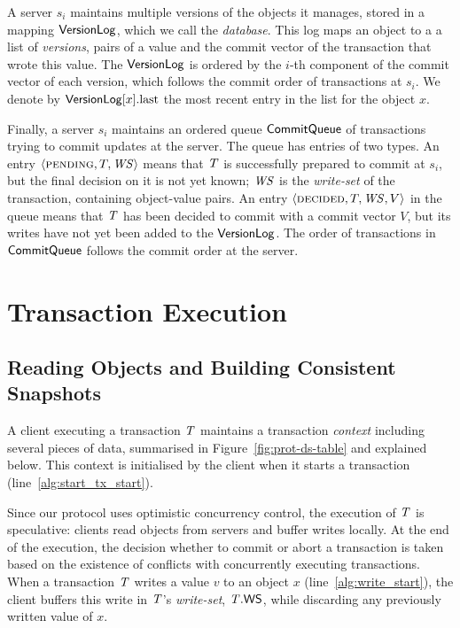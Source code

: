 A server $s_i$ maintains multiple versions of the objects it manages, stored in a mapping $\mathsf{VersionLog}$, which we call the \emph{database}. This log maps an object to a a list of \emph{versions}, pairs of a value and the commit vector of the transaction that wrote this value. The $\mathsf{VersionLog}$ is ordered by the $i$-th component of the commit vector of each version, which follows the commit order of transactions at $s_i$. We denote by $\mathsf{VersionLog}[x].{\rm last}$ the most recent entry in the list for the object $x$.

Finally, a server $s_i$ maintains an ordered queue $\mathsf{CommitQueue}$ of transactions trying to commit updates at the server. The queue has entries of two types. An entry $\langle \text{\sc pending}, T, \mathit{WS} \rangle$ means that $\mathit{T}$ is successfully prepared to commit at $s_i$, but the final decision on it is not yet known; $\mathit{WS}$ is the \emph{write-set} of the transaction, containing object-value pairs. An entry $\langle \text{\sc decided}, T, \mathit{WS}, V \rangle$ in the queue means that $\mathit{T}$ has been decided to commit with a commit vector $V$, but its writes have not yet been added to the $\mathsf{VersionLog}$. The order of transactions in $\mathsf{CommitQueue}$ follows the commit order at the server.

\section{Transaction Execution}



\subsection{Reading Objects and Building Consistent Snapshots}

A client executing a transaction $\mathit{T}$ maintains a transaction \emph{context} including several pieces of data, summarised in Figure~\ref{fig:prot-ds-table} and explained below. This context is initialised by the client when it starts a transaction (line~\ref{alg:start_tx_start}).

Since our protocol uses optimistic concurrency control, the execution of $\mathit{T}$ is speculative: clients read objects from servers and buffer writes locally. At the end of the execution, the decision whether to commit or abort a transaction is taken based on the existence of conflicts with concurrently executing transactions. When a transaction $\mathit{T}$ writes a value $v$ to an object $x$ (line~\ref{alg:write_start}), the client buffers this write in $\mathit{T}$'s \emph{write-set}, $\mathit{T}.\mathsf{WS}$, while discarding any previously written value of $x$.

